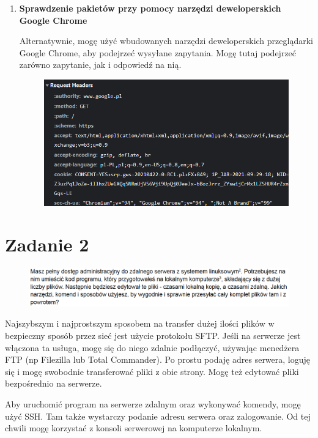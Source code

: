 \documentclass{article}
\begin{document}
\begin{enumerate}
			\item \textbf{Sprawdzenie pakietów przy pomocy narzędzi deweloperskich Google Chrome}
			
			Alternatywnie, mogę użyć wbudowanych narzędzi deweloperskich przeglądarki Google Chrome, aby podejrzeć wysyłane zapytania. Mogę tutaj podejrzeć zarówno zapytanie, jak i odpowiedź na nią.
			\begin{figure}[h!]
				\includegraphics[width=1\textwidth]{chromereq}
			\end{figure}
			 
		\end{enumerate}	
	\section*{Zadanie 2}
		\begin{figure}[h!]
			\includegraphics[width=1\textwidth]{za2}
		\end{figure}
	
		Najszybszym i najprostszym sposobem na transfer dużej ilości plików w bezpieczny sposób przez sieć jest użycie protokołu SFTP. Jeśli na serwerze jest włączona ta usługa, mogę się do niego zdalnie podłączyć, używając menedżera FTP (np Filezilla lub Total Commander). Po prostu podaję adres serwera, loguję się i mogę swobodnie transferować pliki z obie strony. Mogę też edytować pliki bezpośrednio na serwerze.
		
		Aby uruchomić program na serwerze zdalnym oraz wykonywać komendy, mogę użyć SSH. Tam także wystarczy podanie adresu serwera oraz zalogowanie. Od tej chwili mogę korzystać z konsoli serwerowej na komputerze lokalnym.
		
\end{document}
